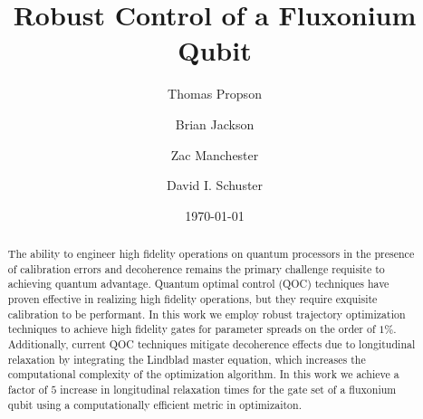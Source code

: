 \documentclass[
  amsfonts,
  amsmath,
  tbtags,
  amssymb,
  aps,
  nobibnotes,
  twocolumn,
  superscriptaddress,
]{revtex4-2}
\begin{document}
\title{Robust Control of a Fluxonium Qubit}

\author{Thomas Propson}
\author{Brian Jackson}
\author{Zac Manchester}
\author{David I. Schuster}

\date{\today}


\begin{abstract}
  The ability to engineer high fidelity operations on quantum processors in the presence of
  calibration errors and decoherence remains the primary challenge requisite to achieving quantum advantage.
  Quantum optimal control (QOC) techniques have proven effective in realizing high fidelity operations,
  but they require exquisite calibration to be performant. In this work we employ robust trajectory optimization techniques
  to achieve high fidelity gates for parameter spreads on the order of $1\%$. 
  Additionally, current QOC techniques mitigate decoherence effects due to longitudinal relaxation by integrating
  the Lindblad master equation, which increases the computational complexity
  of the optimization algorithm.
  In this work we achieve a factor of $5$ increase in longitudinal relaxation times
  for the gate set of a fluxonium qubit
  using a computationally efficient metric in optimizaiton.
\end{abstract}

\maketitle


\end{document}
